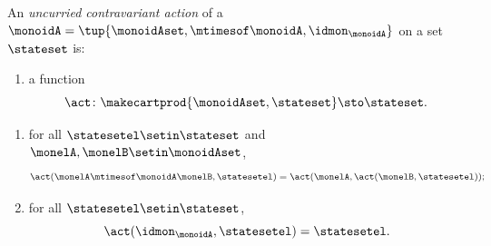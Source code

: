   

    
    
    \begin{ctdefinition}
        \label{def:monoid-uncurried-cont-action}
        An \emph{uncurried contravariant action} of a  $\monoidA = \tup{\monoidAset, \mtimesof\monoidA, \idmon_\monoidA}$ on a set $\stateset$ is:

        \constit
        \begin{enumerate}
            \item a function
                  \begin{equation}
                      \label{eq:uncurried-cont-action}
                      \act \colon \makecartprod{\monoidAset, \stateset} \sto \stateset.
                  \end{equation}
        \end{enumerate}
        \condit
        \begin{enumerate}
            \item for all $\statesetel \setin \stateset$ and $\monelA, \monelB \setin \monoidAset$,
                  \begin{equation}
                      \label{eq:uncurried-cont-action-1cond}
                      \act(\monelA \mtimesof\monoidA \monelB, \statesetel) = \act(\monelA, \act(\monelB, \statesetel));
                  \end{equation}
            \item for all $\statesetel \setin \stateset$,
                  \begin{equation}
                      \label{eq:uncurried-cont-action-2cond}
                      \act(\idmon_\monoidA, \statesetel) = \statesetel.
                  \end{equation}
        \end{enumerate}
    \end{ctdefinition}

